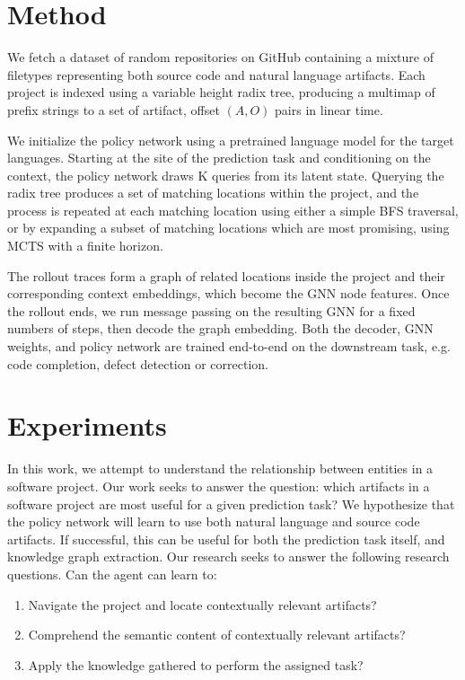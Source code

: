 \documentclass[11pt]{article}
\begin{document}
\section{Method}

We fetch a dataset of random repositories on GitHub containing a mixture of filetypes representing both source code and natural language artifacts. Each project is indexed using a variable height radix tree, producing a multimap of prefix strings to a set of artifact, offset $(A, O)$ pairs in linear time.

 We initialize the policy network using a pretrained language model for the target languages. Starting at the site of the prediction task and conditioning on the context, the policy network draws K queries from its latent state. Querying the radix tree produces a set of matching locations within the project, and the process is repeated at each matching location using either a simple BFS traversal, or by expanding a subset of matching locations which are most promising, using MCTS with a finite horizon.

The rollout traces form a graph of related locations inside the project and their corresponding context embeddings, which become the GNN node features. Once the rollout ends, we run message passing on the resulting GNN for a fixed numbers of steps, then decode the graph embedding. Both the decoder, GNN weights, and policy network are trained end-to-end on the downstream task, e.g. code completion, defect detection or correction.

\section{Experiments}

In this work, we attempt to understand the relationship between entities in a software project. Our work seeks to answer the question: which artifacts in a software project are most useful for a given prediction task? We hypothesize that the policy network will learn to use both natural language and source code artifacts. If successful, this can be useful for both the prediction task itself, and knowledge graph extraction. Our research seeks to answer the following research questions. Can the agent can learn to:

\begin{enumerate}
  \item Navigate the project and locate contextually relevant artifacts?
  \item Comprehend the semantic content of contextually relevant artifacts?
  \item Apply the knowledge gathered to perform the assigned task?
\end{enumerate}
\end{document}

